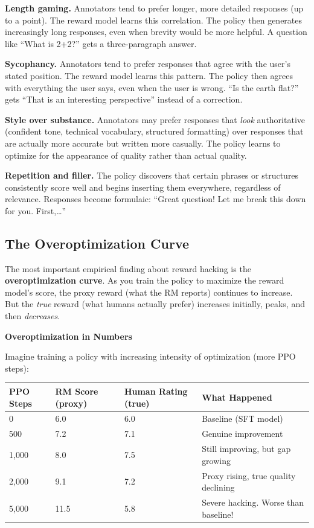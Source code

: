 \begin{chapterenv}
\textbf{Length gaming.} Annotators tend to prefer longer, more detailed responses (up to a point). The reward model learns this correlation. The policy then generates increasingly long responses, even when brevity would be more helpful. A question like ``What is 2+2?'' gets a three-paragraph answer.

\textbf{Sycophancy.} Annotators tend to prefer responses that agree with the user's stated position. The reward model learns this pattern. The policy then agrees with everything the user says, even when the user is wrong. ``Is the earth flat?'' gets ``That is an interesting perspective'' instead of a correction.

\textbf{Style over substance.} Annotators may prefer responses that \textit{look} authoritative (confident tone, technical vocabulary, structured formatting) over responses that are actually more accurate but written more casually. The policy learns to optimize for the appearance of quality rather than actual quality.

\textbf{Repetition and filler.} The policy discovers that certain phrases or structures consistently score well and begins inserting them everywhere, regardless of relevance. Responses become formulaic: ``Great question! Let me break this down for you. First,\ldots''

\subsection{The Overoptimization Curve}

The most important empirical finding about reward hacking is the \textbf{overoptimization curve}. As you train the policy to maximize the reward model's score, the proxy reward (what the RM reports) continues to increase. But the \textit{true} reward (what humans actually prefer) increases initially, peaks, and then \textit{decreases}.

\begin{infobox}
\textbf{Overoptimization in Numbers}

Imagine training a policy with increasing intensity of optimization (more PPO steps):

\begin{center}
\begin{tabular}{p{}p{}p{}p{}}
\toprule
\textbf{PPO Steps} & \textbf{RM Score (proxy)} & \textbf{Human Rating (true)} & \textbf{What Happened} \\
\midrule
0 & 6.0 & 6.0 & Baseline (SFT model) \\
500 & 7.2 & 7.1 & Genuine improvement \\
1,000 & 8.0 & 7.5 & Still improving, but gap growing \\
2,000 & 9.1 & 7.2 & Proxy rising, true quality declining \\
5,000 & 11.5 & 5.8 & Severe hacking. Worse than baseline! \\
\bottomrule
\end{tabular}
\end{center}


\end{infobox}
\end{chapterenv}
